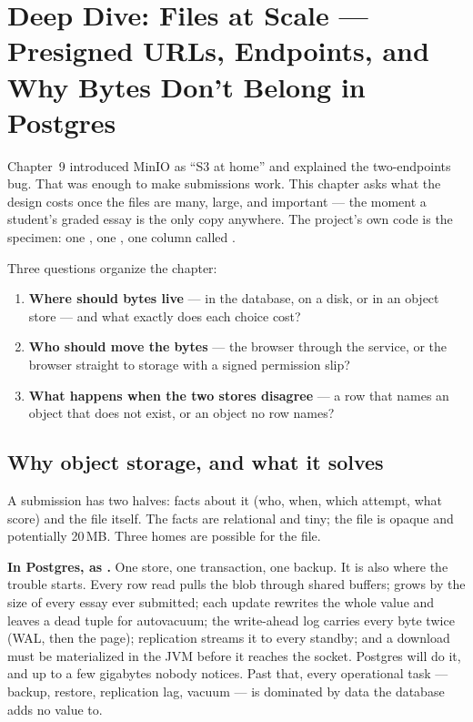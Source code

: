 \chapter{Deep Dive: Files at Scale --- Presigned URLs, Endpoints, and Why Bytes Don't Belong in Postgres}
\label{ch:dd-storage}

Chapter~9 introduced MinIO as ``S3 at home'' and explained the
two-endpoints bug. That was enough to make submissions work. This chapter
asks what the design costs once the files are many, large, and important
--- the moment a student's graded essay is the only copy anywhere. The
project's own code is the specimen: one , one
, one column called .

Three questions organize the chapter:

\begin{enumerate}
  \item \textbf{Where should bytes live} --- in the database, on a
  disk, or in an object store --- and what exactly does each choice cost?
  \item \textbf{Who should move the bytes} --- the browser through the
  service, or the browser straight to storage with a signed permission
  slip?
  \item \textbf{What happens when the two stores disagree} --- a row that
  names an object that does not exist, or an object no row names?
\end{enumerate}

\section{Why object storage, and what it solves}

A submission has two halves: facts about it (who, when, which attempt,
what score) and the file itself. The facts are relational and tiny; the
file is opaque and potentially 20\,MB. Three homes are possible for the
file.

\textbf{In Postgres, as .} One store, one transaction, one
backup. It is also where the trouble starts. Every row read pulls the
blob through shared buffers;  grows by the size of every
essay ever submitted; each update rewrites the whole value and leaves a
dead tuple for autovacuum; the write-ahead log carries every byte twice
(WAL, then the page); replication streams it to every standby; and a
download must be materialized in the JVM before it reaches the socket.
Postgres will do it, and up to a few gigabytes nobody notices. Past that,
every operational task --- backup, restore, replication lag, vacuum ---
is dominated by data the database adds no value to.

